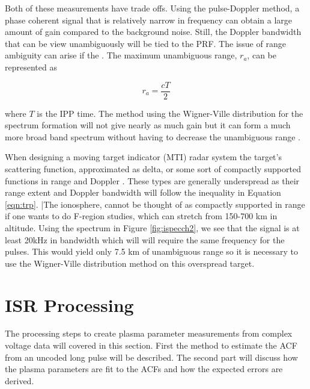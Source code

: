 Both of these measurements have trade offs. Using the pulse-Doppler method, a phase coherent signal that is relatively narrow in frequency can obtain a large amount of gain compared to the background noise. Still, the Doppler bandwidth that can be view unambiguously will be tied to the PRF. The issue of range ambiguity can arise if the . The maximum unambiguous range, $r_a$, can be represented as 

\begin{equation}
\label{eqn:maxuar}
r_a =  \frac{cT}{2}
\end{equation}

\noindent where $T$ is the IPP time. The method using the Wigner-Ville distribution for the spectrum formation will not give nearly as much gain but it can form a much more broad band spectrum without having to decrease the unambiguous range \cite{richards2014fundamentals}.

When designing a moving target indicator (MTI) radar system the target's scattering function, approximated as delta, or some sort of compactly supported functions in range and Doppler \cite{richards2014fundamentals}. These types are generally underspread as their range extent and Doppler bandwidth will follow the inequality in Equation \ref{eqn:trp}. |The ionosphere, cannot be thought of as compactly supported in range if one wants to do F-region studies, which can stretch from 150-700 km in altitude. Using the spectrum in Figure \ref{fig:ispecch2}, we see that the signal is at least 20kHz in bandwidth which will will require the same frequency for the pulses. This would yield only 7.5 km of unambiguous range so it is necessary to use the Wigner-Ville distribution method on this overspread target. 





\section{ISR Processing}
\label{section:isrproc}
The processing steps to create plasma parameter measurements from complex voltage data will covered in this section. First the method to estimate the ACF from an uncoded long pulse will be described. The second part will discuss how the plasma parameters are fit to the ACFs and how the expected errors are derived. 
 
